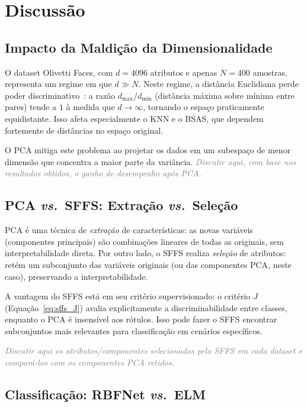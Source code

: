 \documentclass[12pt, a4paper]{article}
\newcommand{\placeholder}[1]{\textcolor{gray}{\textit{#1}}}
\begin{document}
\section{Discussão}
\label{sec:discussao}

\subsection{Impacto da Maldição da Dimensionalidade}

O dataset Olivetti Faces, com $d = 4096$ atributos e apenas $N = 400$ amostras, representa um regime em que $d \gg N$. Neste regime, a distância Euclidiana perde poder discriminativo~\cite{bishop2006}: a razão $d_{\max}/d_{\min}$ (distância máxima sobre mínima entre pares) tende a $1$ à medida que $d \to \infty$, tornando o espaço praticamente equidistante. Isso afeta especialmente o KNN e o BSAS, que dependem fortemente de distâncias no espaço original.

O PCA mitiga este problema ao projetar os dados em um subespaço de menor dimensão que concentra a maior parte da variância. \placeholder{Discutir aqui, com base nos resultados obtidos, o ganho de desempenho após PCA.}

\subsection{PCA \textit{vs.}\ SFFS: Extração \textit{vs.}\ Seleção}

PCA é uma técnica de \emph{extração} de características: as novas variáveis (componentes principais) são combinações lineares de todas as originais, sem interpretabilidade direta. Por outro lado, o SFFS realiza \emph{seleção} de atributos: retém um subconjunto das variáveis originais (ou das componentes PCA, neste caso), preservando a interpretabilidade.

A vantagem do SFFS está em seu critério supervisionado: o critério $J$ (Equação~\ref{eq:sffs_J}) avalia explicitamente a discriminabilidade entre classes, enquanto o PCA é insensível aos rótulos. Isso pode fazer o SFFS encontrar subconjuntos mais relevantes para classificação em cenários específicos.

\placeholder{Discutir aqui os atributos/componentes selecionados pelo SFFS em cada dataset e compará-los com os componentes PCA retidos.}

\subsection{Classificação: RBFNet \textit{vs.}\ ELM}
\end{document}

